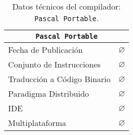 \begin{table}[h]

\begin{center}

\begin{tabular}{|l|l|}\hline
\multicolumn{2}{|c|}{\texttt{Pascal Portable}}\\ 
\hline
\hline
Fecha de Publicación & $\varnothing$ \\ \hline
Conjunto de Instrucciones & $\varnothing$ \\ \hline
Traducción a Código Binario & $\varnothing$ \\ \hline
Paradigma Distribuido & $\varnothing$ \\ \hline
IDE & $\varnothing$ \\ \hline
Multiplataforma & $\varnothing$ \\ \hline
\end{tabular}

\caption{Datos técnicos del compilador: \texttt{Pascal Portable}.}

\end{center}

\end{table}